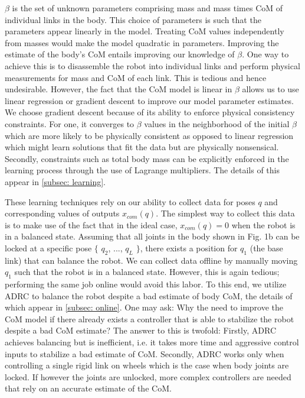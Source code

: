 \documentclass[letterpaper, 10 pt, conference]{ieeeconf}
\begin{document}
$\beta$ is the set of unknown parameters comprising mass and mass times \ac{CoM}
of individual links in the body. This choice of parameters is such that the
parameters appear linearly in the model. Treating \ac{CoM} values independently
from masses would make the model quadratic in parameters. Improving the estimate
of the body's \ac{CoM} entails improving our knowledge of $\beta$. One way to
achieve this is to disassemble the robot into individual links and perform
physical measurements for mass and \ac{CoM} of each link. This is tedious and
hence undesirable. However, the fact that the \ac{CoM} model is linear in
$\beta$ allows us to use linear regression or gradient descent to improve our
model parameter estimates. We choose gradient descent because of its ability to
enforce physical consistency constraints. For one, it converges to $\beta$
values in the neighborhood of the initial $\beta$ which are more likely to be
physically consistent as opposed to linear regression which might learn
solutions that fit the data but are physically nonsensical. Secondly,
constraints such as total body mass can be explicitly enforced in the learning
process through the use of Lagrange multipliers. The details of this appear in
\cref{subsec: learning}.

These learning techniques rely on our ability to collect data for poses $q$ and
corresponding values of outputs $x_{com}(q)$. The simplest way to collect this
data is to make use of the fact that in the ideal case, $x_{com}(q) = 0$ when
the robot is in a balanced state. Assuming that all joints in the body  shown in
Fig. 1b can be locked at a specific pose $\{$ $q_2$, $...$, $q_L$ $\}$, there
exists a position for $q_1$ (the base link) that can balance the robot. We can
collect data offline by manually moving $q_1$ such that the robot is in a
balanced state. However, this is again tedious; performing the same job online
would avoid this labor. To this end, we utilize \ac{ADRC}
\cite{canete2012disturbance} to balance the robot despite a bad estimate of body
\ac{CoM}, the details of which appear in \cref{subsec: online}. One may ask: Why
the need to improve  the \ac{CoM} model if there already exists a controller
that is able to stabilize the robot despite a bad \ac{CoM} estimate? The answer
to this is twofold: Firstly, \ac{ADRC} achieves balancing but is inefficient,
i.e. it takes more time and aggressive control inputs to stabilize a bad
estimate of \ac{CoM}. Secondly, \ac{ADRC} works only when controlling a single
rigid link on wheels which is the case when body joints are locked. If however
the joints are unlocked, more complex controllers are needed that rely on an
accurate estimate of the \ac{CoM}.
\end{document}
